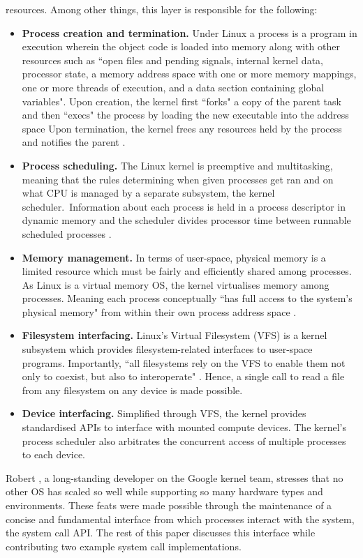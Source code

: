 \documentclass{article}
\begin{document}
resources. Among other things, this layer is responsible for the 
following:
\vspace{1.8mm}
\begin{itemize}
  \item \textbf{Process creation and termination.} Under Linux a process
  is a program in execution wherein the object code is loaded 
  into memory along with other resources such as ``open files and pending signals, internal kernel data, processor state, a memory address space with one or more memory mappings, one or more threads of execution, and a data section containing global variables".
   Upon creation, the kernel first ``forks" 
a copy of the parent task and then ``execs" the process by loading the new
executable into the address space Upon termination, the kernel frees any resources
held by the process and notifies the parent \citep{Love}.
 \item \textbf{Process scheduling.} The Linux kernel is preemptive and multitasking, meaning
 that the rules determining when given processes get ran and on what CPU is managed by
 a separate subsystem, the kernel scheduler.\ Information about each process is held in a
process descriptor in dynamic memory and the scheduler divides processor time 
between runnable scheduled processes \citep{Love7, Kerrisk}.
 \item \textbf{Memory management.} In terms of user-space, 
 physical memory is a limited resource which must be fairly and efficiently shared among
 processes. As Linux is a virtual memory OS, the kernel virtualises memory among processes. 
 Meaning each process conceptually ``has full access to the system's physical memory" 
 from within their own process address space \citep{Love}.
 \item \textbf{Filesystem interfacing.} Linux's Virtual Filesystem (VFS) is a kernel
 subsystem which provides filesystem-related interfaces to user-space programs. Importantly,
 ``all filesystems rely on the VFS to enable them not only to coexist, but also to interoperate"
  \citep{Love}. Hence, a single call to read a file from any filesystem on any device is made possible. 
 \newpage
 \item \textbf{Device interfacing.} Simplified through VFS, the
 kernel provides standardised APIs to interface with mounted compute devices. 
 The kernel's process scheduler also arbitrates the concurrent access of multiple
processes to each device.
\end{itemize}

\noindent Robert \citet{Love7}, a long-standing developer on the Google kernel team, 
stresses that no other OS has scaled so well while supporting so many 
hardware types and environments. These feats were made possible 
through the maintenance of a concise and fundamental interface 
from which processes interact with the system, the system call
API. The rest of this paper discusses this interface while 
contributing two example system call implementations.
 
\end{document}
